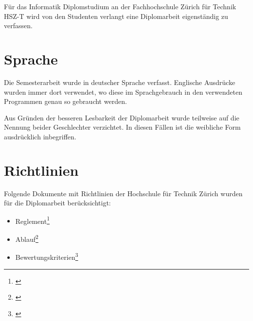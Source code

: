 Für das Informatik Diplomstudium an der Fachhochschule Zürich für Technik
HSZ-T wird von den Studenten verlangt eine Diplomarbeit eigenständig zu
verfassen.

\section{Sprache}
Die Semesterarbeit wurde in deutscher Sprache verfasst. Englische Ausdrücke 
wurden immer dort verwendet, wo diese im Sprachgebrauch in den verwendeten 
Programmen genau so gebraucht werden.

Aus Gründen der besseren Lesbarkeit der Diplomarbeit wurde teilweise auf 
die Nennung beider Geschlechter verzichtet. In diesen Fällen ist die 
weibliche Form ausdrücklich inbegriffen.
  
\section{Richtlinien}
Folgende Dokumente mit Richtlinien der Hochschule für Technik Zürich 
wurden für die Diplomarbeit berücksichtigt:

\begin{itemize}
    \item Reglement\footnote{\citealp*[Vgl.][ganzes Dokument]{hsz_reglement}}
    \item Ablauf\footnote{\citealp*[Vgl.][ganzes Dokument]{hsz_ablauf}}
    \item Bewertungskriterien\footnote{\citealp*[Vgl.][ganzes Dokument]{hsz_bewertungskriterien}}
\end{itemize}
